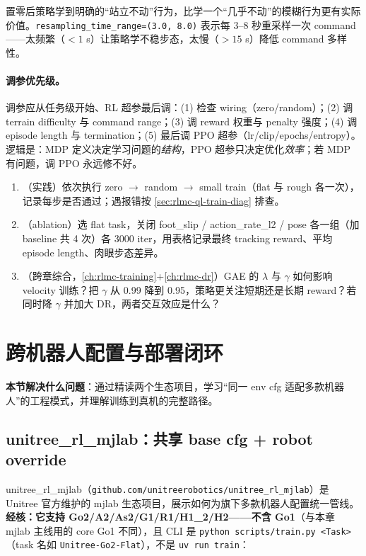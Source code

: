 置零后策略学到明确的“站立不动”行为，比学一个“几乎不动”的模糊行为更有实际价值。\verb|resampling_time_range=(3.0, 8.0)| 表示每 3--8 秒重采样一次 command——太频繁（$<1$ s）让策略学不稳步态，太慢（$>15$ s）降低 command 多样性。

\paragraph{调参优先级。}调参应从任务级开始、RL 超参最后调：(1) 检查 wiring（zero/random）；(2) 调 terrain difficulty 与 command range；(3) 调 reward 权重与 penalty 强度；(4) 调 episode length 与 termination；(5) 最后调 PPO 超参（lr/clip/epochs/entropy）。逻辑是：MDP 定义决定学习问题的\emph{结构}，PPO 超参只决定优化\emph{效率}；若 MDP 有问题，调 PPO 永远修不好。

\begin{practice}[训练流程]
\begin{enumerate}
\item （实践）依次执行 zero $\to$ random $\to$ small train（flat 与 rough 各一次），记录每步是否通过；遇报错按 \cref{sec:rlmc-ql-train-diag} 排查。
\item （ablation）选 flat task，关闭 foot\_slip / action\_rate\_l2 / pose 各一组（加 baseline 共 4 次）各 3000 iter，用表格记录最终 tracking reward、平均 episode length、肉眼步态差异。
\item （跨章综合，\cref{ch:rlmc-training}+\cref{ch:rlmc-dr}）GAE 的 $\lambda$ 与 $\gamma$ 如何影响 velocity 训练？把 $\gamma$ 从 0.99 降到 0.95，策略更关注短期还是长期 reward？若同时降 $\gamma$ 并加大 DR，两者交互效应是什么？
\end{enumerate}
\end{practice}

\section{跨机器人配置与部署闭环}
\label{sec:rlmc-ql-multirobot}

\textbf{本节解决什么问题}：通过精读两个生态项目，学习“同一 env cfg 适配多款机器人”的工程模式，并理解训练到真机的完整路径。

\subsection{unitree\_rl\_mjlab：共享 base cfg + robot override}
\label{sec:rlmc-ql-multirobot-unitree}

unitree\_rl\_mjlab（\verb|github.com/unitreerobotics/unitree_rl_mjlab|）是 Unitree 官方维护的 mjlab 生态项目，展示如何为旗下多款机器人配置统一管线。\textbf{经核：它支持 Go2/A2/As2/G1/R1/H1\_2/H2——不含 Go1}（与本章 mjlab 主线用的 core Go1 不同），且 CLI 是 \verb|python scripts/train.py <Task>|（task 名如 \verb|Unitree-Go2-Flat|），不是 \verb|uv run train|：

